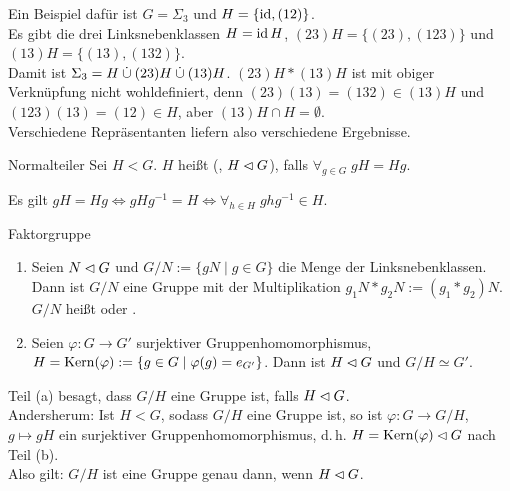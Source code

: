 \begin{Bsp}
    Ein Beispiel dafür ist $G = \Sigma_3$ und $H = \{\operatorname{id}, (1 2)\}$.\\
    Es gibt die drei Linksnebenklassen
    $H = \operatorname{id} H$,
    $(2 3)H = \{(2 3), (1 2 3)\}$ und
    $(1 3)H = \{(1 3), (1 3 2)\}$.\\
    Damit ist $\Sigma_3 = H \mathbin{\dot{\cup}} (2 3)H \mathbin{\dot{\cup}} (1 3)H$.
    $(23)H \ast (13)H$ ist mit obiger Verknüpfung nicht wohl\-definiert, denn
    $(23)(13) = (132) \in (13)H$ und
    $(123)(13) = (12) \in H$, aber $(13)H \cap H = \emptyset$.\\
    Verschiedene Repräsentanten liefern also verschiedene Ergebnisse.
\end{Bsp}

\linie

\begin{Def}{Normalteiler}
    Sei $H < G$.
    $H$ heißt  (, $H \mathbin{\vartriangleleft} G$), falls
    $\forall_{g \in G}\; gH = Hg$.
\end{Def}

\begin{Bem}
    Es gilt
    $gH = Hg \iff gHg^{-1} = H \iff \forall_{h \in H}\; ghg^{-1} \in H$.
\end{Bem}

\begin{Prop}{Faktorgruppe}
    \begin{enumerate}[label=(\alph*)]
        \item
        Seien $N \mathbin{\vartriangleleft} G$ und $G/N := \{gN \;|\; g \in G\}$
        die Menge der Linksnebenklassen.\\
        Dann ist $G/N$ eine Gruppe mit der Multiplikation
        $g_1 N \ast g_2 N := (g_1 \ast g_2) N$.\\
        $G/N$ heißt  oder .
        
        \item
        Seien $\varphi\colon G \rightarrow G'$ surjektiver
        Gruppenhomomorphismus,\\
        $H = \operatorname{Kern}(\varphi) :=
        \{g \in G \;|\; \varphi(g) = e_{G'}\}$.
        Dann ist $H \mathbin{\vartriangleleft} G$ und $G/H \simeq G'$.
    \end{enumerate}
\end{Prop}

\begin{Bem}
    Teil (a) besagt, dass $G/H$ eine Gruppe ist, falls $H \mathbin{\vartriangleleft} G$.\\
    Andersherum: Ist $H < G$, sodass $G/H$ eine Gruppe ist, so ist
    $\varphi\colon G \rightarrow G/H$, $g \mapsto gH$ ein surjektiver
    Gruppenhomomorphismus, d.\,h. $H = \operatorname{Kern}(\varphi) \mathbin{\vartriangleleft} G$ nach Teil (b).\\
    Also gilt: $G/H$ ist eine Gruppe genau dann, wenn $H \mathbin{\vartriangleleft} G$.
\end{Bem}

